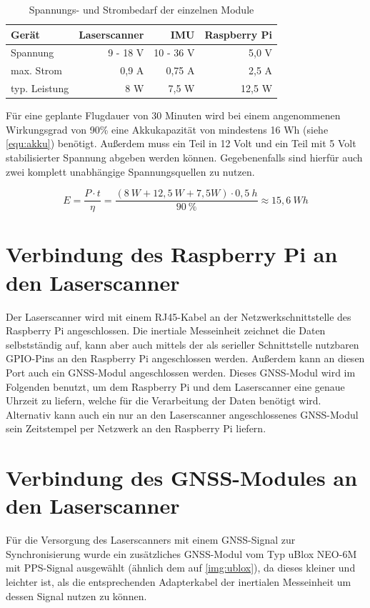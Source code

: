 \documentclass[a4paper,12pt,bibliography=totoc, listof=totoc,titlepage,pointlessnumbers]{scrreprt}
\begin{document}
\begin{table}[!ht]
\centering
\begin{tabular}{ l | r | r | r }
  Gerät 	& Laser\-scan\-ner	& IMU		& Rasp\-berry Pi\\
  \hline
  Spannung 	& 9 - 18 V 	& 10 - 36 V	& 5,0 V \\
  \hline
  max. Strom 	& 0,9 A		& 0,75 A	& 2,5 A \\
  \hline
  typ. Leistung	& 8 W		& 7,5 W		& 12,5 W 
\end{tabular}
\caption{Spannungs- und Strombedarf der einzelnen Module \citep{vlpSheet,imar,raspSheet}}
\label{tab:strom}
\end{table}

Für eine geplante Flugdauer von 30 Minuten wird bei einem angenommenen Wirkungsgrad von 90\% eine Akkukapazität von mindestens 16 Wh (siehe \autoref{equ:akku}) benötigt. Außerdem muss ein Teil in 12 Volt und ein Teil mit 5 Volt stabilisierter Spannung abgeben werden können. Gegebenenfalls sind hierfür auch zwei komplett unabhängige Spannungsquellen zu nutzen.

\begin{equation}
\label{equ:akku}
E = \frac{ P \cdot t}{\eta} = \frac{(8~W + 12,5~W + 7,5W) \cdot 0,5~h}{90~\%} \approx 15,6~Wh
\end{equation}

\section{Verbindung des Rasp\-berry Pi an den Laser\-scan\-ner}
Der Laser\-scan\-ner wird mit einem RJ45-Kabel an der Netzwerkschnittstelle des Raspberry Pi angeschlossen. Die inertiale Messeinheit zeichnet die Daten selbst\-stän\-dig auf, kann aber auch mittels der als serieller Schnittstelle nutzbaren GPIO-Pins an den Rasp\-berry Pi angeschlossen werden. Außerdem kann an diesen Port auch ein GNSS-Modul angeschlossen werden. Dieses GNSS-Modul wird im Folgenden benutzt, um dem Rasp\-berry Pi und dem Laserscanner eine genaue Uhrzeit zu liefern, welche für die Verarbeitung der Daten benötigt wird. Alternativ kann auch ein nur an den Laser\-scan\-ner angeschlossenes GNSS-Modul sein Zeitstempel per Netzwerk an den Rasp\-berry Pi liefern.

\section{Verbindung des GNSS-Modules an den Laser\-scan\-ner}
\label{s:GNSSAnschluss}
Für die Versorgung des Laser\-scan\-ners mit einem GNSS-Signal zur Synchronisierung wurde ein zusätzliches GNSS-Modul vom Typ uBlox NEO-6M mit PPS-Signal ausgewählt (ähnlich dem auf \autoref{img:ublox}), da dieses kleiner und leichter ist, als die entsprechenden Adapterkabel der inertialen Messeinheit um dessen Signal nutzen zu können.
\end{document}
